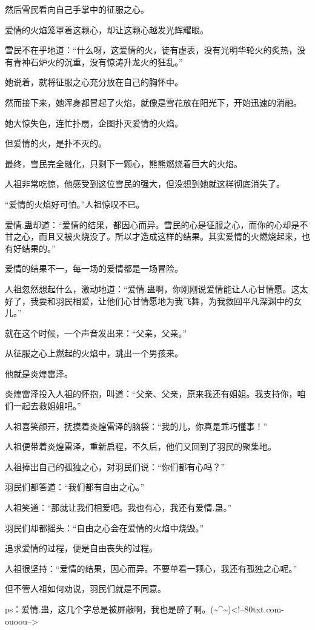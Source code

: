 \begin{this_body}
然后雪民看向自己手掌中的征服之心。

爱情的火焰笼罩着这颗心，却让这颗心越发光辉耀眼。

雪民不在乎地道：“什么呀，这爱情的火，徒有虚表，没有光明华轮火的炙热，没有青神石炉火的沉重，没有惊涛升龙火的狂乱。”

她说着，就将征服之心充分放在自己的胸怀中。

然而接下来，她浑身都冒起了火焰，就像是雪花放在阳光下，开始迅速的消融。

她大惊失色，连忙扑扇，企图扑灭爱情的火焰。

但爱情的火，是扑不灭的。

最终，雪民完全融化，只剩下一颗心，熊熊燃烧着巨大的火焰。

人祖非常吃惊，他感受到这位雪民的强大，但没想到她就这样彻底消失了。

“爱情的火焰好可怕。”人祖惊叹不已。

爱情.蛊却道：“爱情的结果，都因心而异。雪民的心是征服之心，而你的心却是不甘之心，而且又被火烧没了。所以才造成这样的结果。其实爱情的火燃烧起来，也有好结果的。”

爱情的结果不一，每一场的爱情都是一场冒险。

人祖忽然想起什么，激动地道：“爱情.蛊啊，你刚刚说爱情能让人心甘情愿。这太好了，我要和羽民相爱，让他们心甘情愿地为我飞舞，为我救回平凡深渊中的女儿。”

就在这个时候，一个声音发出来：“父亲，父亲。”

从征服之心上燃起的火焰中，跳出一个男孩来。

他就是炎煌雷泽。

炎煌雷泽投入人祖的怀抱，叫道：“父亲、父亲，原来我还有姐姐。我支持你，咱们一起去救姐姐吧。”

人祖喜笑颜开，抚摸着炎煌雷泽的脑袋：“我的儿，你真是乖巧懂事！”

人祖便带着炎煌雷泽，重新启程，不久后，他们又回到了羽民的聚集地。

人祖捧出自己的孤独之心，对羽民们说：“你们都有心吗？”

羽民们都答道：“我们都有自由之心。”

人祖笑道：“那就让我们相爱吧。我也有心，我还有爱情.蛊。”

羽民们却都摇头：“自由之心会在爱情的火焰中烧毁。”

追求爱情的过程，便是自由丧失的过程。

人祖很坚持：“爱情的结果，因心而异。不要单看一颗心，我还有孤独之心呢。”

但不管人祖如何劝说，羽民们就是不同意。

ps：爱情.蛊，这几个字总是被屏蔽啊，我也是醉了啊。(\~{}\^{}\~{})<!--80txt.com-ouoou-->

\end{this_body}

